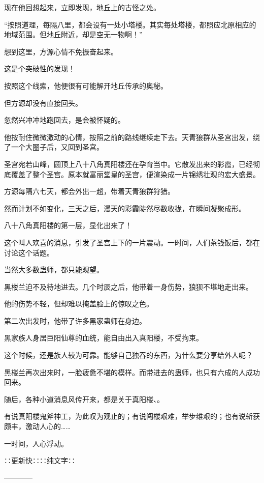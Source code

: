 \begin{this_body}
现在他回想起来，立即发现，地丘上的古怪之处。

“按照道理，每隔八里，都会设有一处小塔楼。其实每处塔楼，都照应北原相应的地域范围。但地丘附近，却是空无一物啊！”

想到这里，方源心情不免振奋起来。

这是个突破性的发现！

按照这个线索，他便很有可能解开地丘传承的奥秘。

但方源却没有直接回头。

忽然兴冲冲地跑回去，是会被怀疑的。

他按耐住微微激动的心情，按照之前的路线继续走下去。天青狼群从圣宫出发，绕了一个大圈子后，又回到圣宫。

圣宫宛若山峰，圆顶上八十八角真阳楼还在孕育当中。它散发出来的彩霞，已经彻底覆盖了整个圣宫。原本就富丽堂皇的圣宫，便渲染成一片锦绣壮观的宏大盛景。

方源每隔六七天，都会外出一趟，带着天青狼群狩猎。

然而计划不如变化，三天之后，漫天的彩霞陡然尽数收拢，在瞬间凝聚成形。

八十八角真阳楼的第一层，显化出来了！

这个叫人欢喜的消息，引发了圣宫上下的一片震动。一时间，人们茶钱饭后，都在讨论这个话题。

当然大多数蛊师，都只能观望。

黑楼兰迫不及待地进去。几个时辰之后，他带着一身伤势，狼狈不堪地走出来。

他的伤势不轻，但却难以掩盖脸上的惊叹之色。

第二次出发时，他带了许多黑家蛊师在身边。

黑家族人身居巨阳仙尊的血统，能自由出入真阳楼，不受拘束。

这个时候，还是族人较为可靠。能够自己独吞的东西，为什么要分享给外人呢？

黑楼兰再次出来时，一脸疲惫不堪的模样。而带进去的蛊师，也只有六成的人成功回来。

随后，各种小道消息风传开来，都是关于真阳楼、。

有说真阳楼鬼斧神工，为此叹为观止的；有说闯楼艰难，举步维艰的；也有说斩获颇丰，激动人心的……

一时间，人心浮动。

∷更新快∷∷纯文字∷

------------

\end{this_body}

